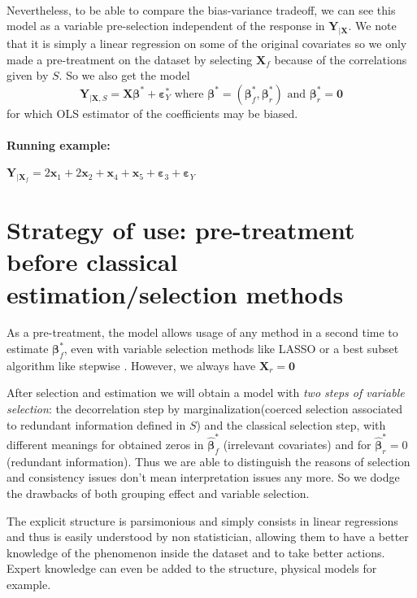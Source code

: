 \documentclass[11pt,a4paper]{report}
\begin{document}
\\
Nevertheless, to be able to compare the bias-variance tradeoff, we can see this model as a variable pre-selection independent of the response in $\boldsymbol{Y}_{|\boldsymbol{X}}$.
We note that it is simply a linear regression on some of the original covariates so we only made a pre-treatment on the dataset by selecting $\boldsymbol{X}_f$ because of the correlations given by $S$. So we also get the model
\begin{equation}
\boldsymbol{Y}_{|\boldsymbol{X},S}=\boldsymbol{X}\boldsymbol{\beta}^*+\boldsymbol{\varepsilon}_Y^* \textrm{ where }\boldsymbol{\beta}^*=(\boldsymbol{\beta}_f^*,\boldsymbol{\beta}_r^*) \textrm{ and } \boldsymbol{\beta}_r^*=\boldsymbol{0}
\end{equation}
	for which OLS estimator of the coefficients may be biased.  

\paragraph{Running example:} $\boldsymbol{Y}_{|\boldsymbol{X}_f}= 2\boldsymbol{x}_1+2\boldsymbol{x}_2+\boldsymbol{x}_4+\boldsymbol{x}_5+\boldsymbol{\varepsilon}_3 +\boldsymbol{\varepsilon}_Y$
\section{Strategy of use: pre-treatment before classical estimation/selection methods}\label{interpretation}

As a pre-treatment, the model allows usage of any method in a second time to estimate $\boldsymbol{\beta}_f^*$, even with variable selection methods like LASSO or a best subset algorithm like stepwise \cite{seber2012linear}. However, we always have $\boldsymbol{X}_r=\boldsymbol{0}$

After selection and estimation we will obtain a model with { \it two steps of variable selection}: the decorrelation step by marginalization(coerced selection associated to redundant information defined in $S$) and the classical selection step, with different meanings for obtained zeros in $\hat{\boldsymbol{\beta}}^*_f$ (irrelevant covariates) and for $\hat{\boldsymbol{\beta}}^*_r=0$ (redundant information). 
 Thus we are able to distinguish the reasons of selection and consistency issues don't mean interpretation issues any more. So we dodge the drawbacks of both grouping effect and variable selection.


The explicit structure is parsimonious and simply consists in linear regressions and thus is easily understood by non statistician, allowing them to have a better knowledge of the phenomenon inside the dataset and to take better actions. Expert knowledge can even be added to the structure, physical models for example.
\end{document}
